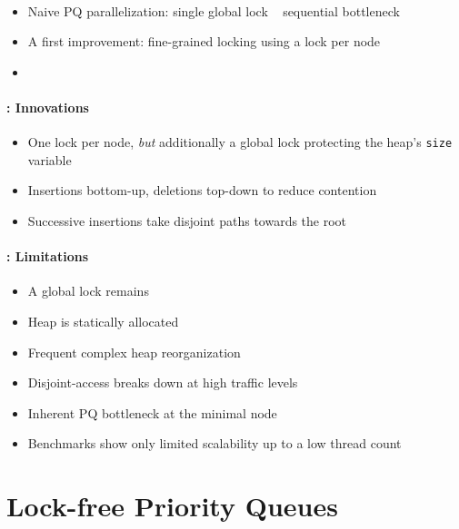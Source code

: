 \documentclass[usenames,dvipsnames]{beamer}
\begin{document}
\begin{frame}{}
\framesubtitle{\citeauthor{hunt1996efficient}}

\begin{itemize}
\item Naive \ac{PQ} parallelization: single global lock \textrightarrow ~ sequential bottleneck
\item A first improvement: fine-grained locking using a lock per node
\item {}
\end{itemize}
\end{frame}

\begin{frame}{}
\framesubtitle{\citeauthor{hunt1996efficient}: Innovations}

\begin{itemize}
\item One lock per node, \emph{but} additionally a global lock protecting the heap's
      \lstinline|size| variable
\item Insertions bottom-up, deletions top-down to reduce contention
\item Successive insertions take disjoint paths towards the root
\end{itemize}
\end{frame}

\begin{frame}{}
\framesubtitle{\citeauthor{hunt1996efficient}: Limitations}

\begin{itemize}
\item A global lock remains
\item Heap is statically allocated
\item Frequent complex heap reorganization
\item Disjoint-access breaks down at high traffic levels
\item Inherent \ac{PQ} bottleneck at the minimal node
\item Benchmarks show only limited scalability up to a low thread count
\end{itemize}
\end{frame}

\section{Lock-free Priority Queues} \label{sec:lockfree}
\end{document}
